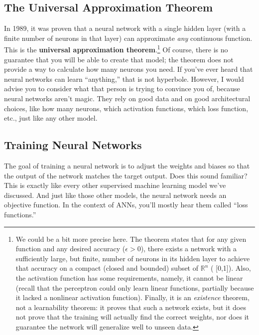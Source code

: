 \subsection*{The Universal Approximation Theorem}
In 1989, it was proven that a neural network with a single hidden layer (with a finite number of neurons in that layer) can approximate \textit{any} continuous function. This is the \textbf{universal approximation theorem}.\footnote{We could be a bit more precise here. The theorem states that for any given function and any desired accuracy ($\epsilon > 0$), there exists a network with a sufficiently large, but finite, number of neurons in its hidden layer to achieve that accuracy on a compact (closed and bounded) subset of $\mathbb{R}^n$ (\eg{} [0,1]). Also, the activation function has some requirements, namely, it cannot be linear (recall that the perceptron could only learn linear functions, partially because it lacked a nonlinear activation function). Finally, it is an \emph{existence} theorem, not a learnability theorem: it proves that such a network exists, but it does not prove that the training will actually find the correct weights, nor does it guarantee the network will generalize well to unseen data.} Of course, there is no guarantee that you will be able to create that model; the theorem does not provide a way to calculate how many neurons you need. If you've ever heard that neural networks can learn ``anything,'' that is not hyperbole. However, I would advise you to consider what that person is trying to convince you of, because neural networks aren't magic. They rely on good data and on good architectural choices, like how many neurons, which activation functions, which loss function, etc., just like any other model.

\subsection*{Training Neural Networks}
The goal of training a neural network is to adjust the weights and biases so that the output of the network matches the target output. Does this sound familiar? This is exactly like every other supervised machine learning model we've discussed. And just like those other models, the neural network needs an objective function. In the context of ANNs, you'll mostly hear them called ``loss functions.''

